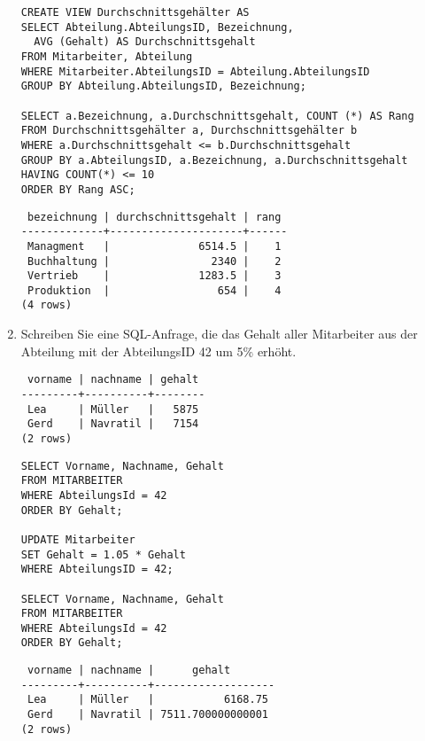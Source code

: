 \documentclass{bschlangaul-aufgabe}
\begin{document}
\begin{enumerate}
\begin{liAntwort}
\begin{verbatim}
CREATE VIEW Durchschnittsgehälter AS
SELECT Abteilung.AbteilungsID, Bezeichnung,
  AVG (Gehalt) AS Durchschnittsgehalt
FROM Mitarbeiter, Abteilung
WHERE Mitarbeiter.AbteilungsID = Abteilung.AbteilungsID
GROUP BY Abteilung.AbteilungsID, Bezeichnung;

SELECT a.Bezeichnung, a.Durchschnittsgehalt, COUNT (*) AS Rang
FROM Durchschnittsgehälter a, Durchschnittsgehälter b
WHERE a.Durchschnittsgehalt <= b.Durchschnittsgehalt
GROUP BY a.AbteilungsID, a.Bezeichnung, a.Durchschnittsgehalt
HAVING COUNT(*) <= 10
ORDER BY Rang ASC;
\end{verbatim}

\begin{verbatim}
 bezeichnung | durchschnittsgehalt | rang
-------------+---------------------+------
 Managment   |              6514.5 |    1
 Buchhaltung |                2340 |    2
 Vertrieb    |              1283.5 |    3
 Produktion  |                 654 |    4
(4 rows)
\end{verbatim}
\end{liAntwort}


\item Schreiben Sie eine SQL-Anfrage, die das Gehalt aller Mitarbeiter
aus der Abteilung mit der AbteilungsID 42 um 5\% erhöht.

\begin{liAntwort}
\begin{verbatim}
 vorname | nachname | gehalt
---------+----------+--------
 Lea     | Müller   |   5875
 Gerd    | Navratil |   7154
(2 rows)
\end{verbatim}

\begin{verbatim}
SELECT Vorname, Nachname, Gehalt
FROM MITARBEITER
WHERE AbteilungsId = 42
ORDER BY Gehalt;

UPDATE Mitarbeiter
SET Gehalt = 1.05 * Gehalt
WHERE AbteilungsID = 42;

SELECT Vorname, Nachname, Gehalt
FROM MITARBEITER
WHERE AbteilungsId = 42
ORDER BY Gehalt;
\end{verbatim}

\begin{verbatim}
 vorname | nachname |      gehalt
---------+----------+-------------------
 Lea     | Müller   |           6168.75
 Gerd    | Navratil | 7511.700000000001
(2 rows)
\end{verbatim}
\end{liAntwort}


\end{enumerate}
\end{document}
